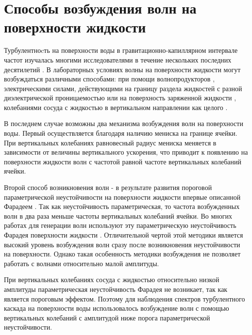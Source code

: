 \section{Способы возбуждения волн на поверхности жидкости}\label{p1_methodsExt}

Турбулентноcть на поверхности воды в гравитационно-капиллярном интервале частот изучалась многими исследователями в течение нескольких последних десятилетий \cite{Falcon2007, Henry2000, Shats2010, Denissenko2007}. В лабораторных условиях волны на поверхности жидкости могут возбуждаться различными способами: при помощи волнопродукторов \cite{Havelock1929, Falcon2007}, электрическими силами, действующими на границу раздела жидкостей с разной диэлектрической проницаемостью \cite{Kalinichenko1982} или на поверхность заряженной жидкости \cite{Brazhnikov2002}, колебаниями сосуда с жидкостью в вертикальном направлении как целого \cite{Miles1990}.

В последнем случае возможны два механизма возбуждения волн на поверхности воды. Первый осуществляется благодаря наличию мениска на границе ячейки. При вертикальных колебаниях равновесный радиус мениска меняется в зависимости от величины вертикального ускорения, что приводит к появлению на поверхности жидкости волн с частотой равной частоте вертикальных колебаний ячейки. 

Второй способ возникновения волн - в результате развития пороговой параметрической неустойчивости на поверхности жидкости впервые описанной Фарадеем \cite{Faraday1831}. Так как неустойчивость параметрическая, то частота возбужденных волн в два раза меньше частоты вертикальных колебаний ячейки. Во многих работах для генерации волн используют эту параметрическую неустойчивость Фарадея поверхности жидкости \cite{Henry2000, Shats2010, Denissenko2007}. Отличительной чертой этой методики является высокий уровень возбуждения волн сразу после возникновения неустойчивости на поверхности. Однако такая особенность методики возбуждения не позволяет работать с волнами относительно малой амплитуды.

При вертикальных колебаниях сосуда с жидкостью относительно низкой амплитуды параметрическая неустойчивость Фарадея не возникает, так как является пороговым эффектом. Поэтому для наблюдения спектров турбулентного каскада на поверхности воды использовалось возбуждение волн с помощью вертикальных колебаний с амплитудой ниже порога параметрической неустойчивости. 

